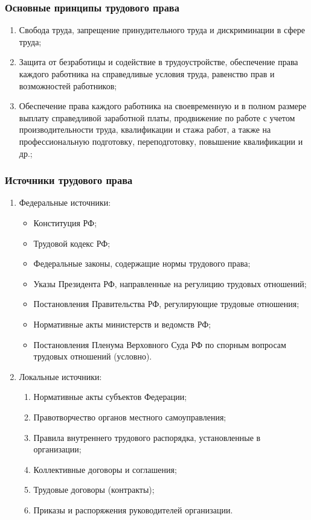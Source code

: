 \subsubsection{Основные принципы трудового права}
\begin{enumerate}
	\item Свобода труда, запрещение принудительного труда и дискриминации в сфере труда;
	\item Защита от безработицы и содействие в трудоустройстве, обеспечение права каждого работника на справедливые условия труда, равенство прав и возможностей работников;
	\item Обеспечение права каждого работника на своевременную и в полном размере выплату справедливой заработной платы, продвижение по работе с учетом производительности труда, квалификации и стажа работ, а также на профессиональную подготовку, переподготовку, повышение квалификации и др.;
\end{enumerate}

\subsubsection{Источники трудового права}
\begin{enumerate}
	\item Федеральные источники:
	\begin{itemize}
		\item Конституция РФ;
		\item Трудовой кодекс РФ;
		\item Федеральные законы, содержащие нормы трудового права;
		\item Указы Президента РФ, направленные на регулицию трудовых отношений;
		\item Постановления Правительства РФ, регулирующие трудовые отношения;
		\item Нормативные акты министерств и ведомств РФ;
		\item Постановления Пленума Верховного Суда РФ по спорным вопросам трудовых отношений (условно).
	\end{itemize}
	\item Локальные источники:
	\begin{enumerate}
		\item Нормативные акты субъектов Федерации;
		\item Правотворчество органов местного самоуправления;
		\item Правила внутреннего трудового распорядка, установленные в организации;
		\item Коллективные договоры и соглашения;
		\item Трудовые договоры (контракты);
		\item Приказы и распоряжения руководителей организации.
	\end{enumerate}
\end{enumerate}

